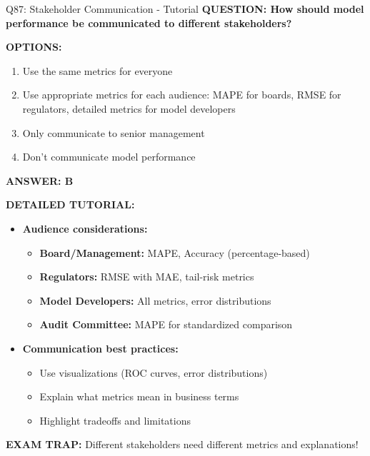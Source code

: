 \documentclass[8pt]{beamer}
\begin{document}
\begin{frame}{Q87: Stakeholder Communication - Tutorial}
	\fontsize{6.5}{7.5}\selectfont
	\textbf{QUESTION: How should model performance be communicated to different stakeholders?}
	
	\vspace{0.1cm}
	\textbf{OPTIONS:}
	\begin{enumerate}
		\item Use the same metrics for everyone
		\item Use appropriate metrics for each audience: MAPE for boards, RMSE for regulators, detailed metrics for model developers
		\item Only communicate to senior management
		\item Don't communicate model performance
	\end{enumerate}
	
	\vspace{0.1cm}
	\textcolor{myblue}{\textbf{ANSWER: B}}
	
	\vspace{0.1cm}
	\textbf{DETAILED TUTORIAL:}
	\begin{itemize}
		\item \textbf{Audience considerations:}
		\begin{itemize}
			\item \textbf{Board/Management:} MAPE, Accuracy (percentage-based)
			\item \textbf{Regulators:} RMSE with MAE, tail-risk metrics
			\item \textbf{Model Developers:} All metrics, error distributions
			\item \textbf{Audit Committee:} MAPE for standardized comparison
		\end{itemize}
		\item \textbf{Communication best practices:}
		\begin{itemize}
			\item Use visualizations (ROC curves, error distributions)
			\item Explain what metrics mean in business terms
			\item Highlight tradeoffs and limitations
		\end{itemize}
	\end{itemize}
	
	\textcolor{myred}{\textbf{EXAM TRAP:}} Different stakeholders need \textcolor{myblue}{different metrics and explanations}!
\end{frame}
\end{document}
